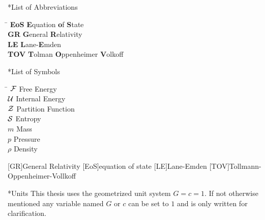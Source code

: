 \thispagestyle{empty}
\begin{section}*{List of Abbreviations}
\begin{tabbing}
\hspace{2cm}\= \kill
\textbf{EoS}        \> \textbf{E}quation \textbf{o}f \textbf{S}tate\\
\textbf{GR} 		\> \textbf{G}eneral \textbf{R}elativity \\
\textbf{LE}			\> \textbf{L}ane-\textbf{E}mden\\
\textbf{TOV}		\> \textbf {T}olman \textbf{O}ppenheimer \textbf{V}olkoff


\end{tabbing}


\end{section}
\begin{section}*{List of Symbols}
\begin{tabbing}
\hspace{2cm}\=\kill
$\mathcal{F}$				\> Free Energy\\
$\mathcal{U}$				\> Internal Energy\\
$\mathcal{Z}$				\> Partition Function\\
$\mathcal{S}$				\> Entropy\\
$m$					\> Mass\\
$p$					\> Pressure\\
$\rho$				\> Density
\end{tabbing}

\begin{acronym}
	[GR]{General Relativity}
	[EoS]{equation of state}
	[LE]{Lane-Emden}
	[TOV]{Tollmann-Oppenheimer-Vollkoff}
\end{acronym}

\end{section}

\begin{section}*{Units}
This thesis uses the geometrized unit system $G=c=1$.
If not otherwise mentioned any variable named $G$ or $c$ can be set to $1$ and is only written for clarification.
\end{section}
